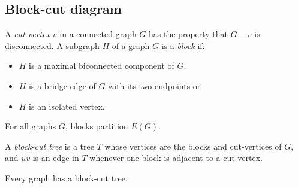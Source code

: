 \subsection{Block-cut diagram}
A \textit{cut-vertex} $v$ in a connected graph $G$ has the property that $G - v$ is disconnected.
A subgraph $H$ of a graph $G$ is a \textit{block} if:
\begin{itemize}
	\item $H$ is a maximal biconnected component of $G$,
	\item $H$ is a bridge edge of $G$ with its two endpoints or
	\item $H$ is an isolated vertex.
\end{itemize}

\begin{theorem}
	For all graphs $G$, blocks partition $E(G)$.
\end{theorem}

A \textit{block-cut tree} is a tree $T$ whose vertices are the blocks and cut-vertices of $G$, and $uv$ is an edge in $T$ whenever one block is adjacent to a cut-vertex. 

\begin{theorem}\label{thm:block-cut tree}
	Every graph has a block-cut tree.
\end{theorem}